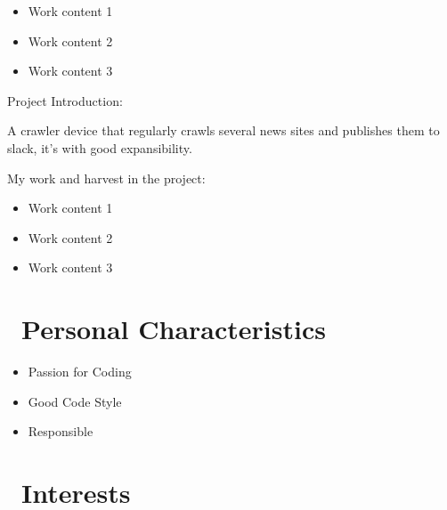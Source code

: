 \documentclass{resume}
\begin{document}
\begin{itemize}[parsep=1ex]
  \item Work content 1
  \item Work content 2
  \item Work content 3
\end{itemize}


\vspace{1mm}\par
\noindent
Project Introduction:

\vspace{1mm}\par
\setlength{\parindent}{2ex}
A crawler device that regularly crawls several news sites and publishes them to slack,
 it's with good expansibility.

\vspace{1mm}\par
\noindent
My work and harvest in the project:

\begin{itemize}[parsep=1ex]
  \item Work content 1
  \item Work content 2
  \item Work content 3
\end{itemize}

\section{\faUser\ Personal Characteristics} \vspace{1mm}

\begin{itemize}[parsep=1ex]
  \item Passion for Coding
  \item Good Code Style
  \item Responsible
\end{itemize}

\section{\faSunO\ Interests} \vspace{1mm}
\end{document}
